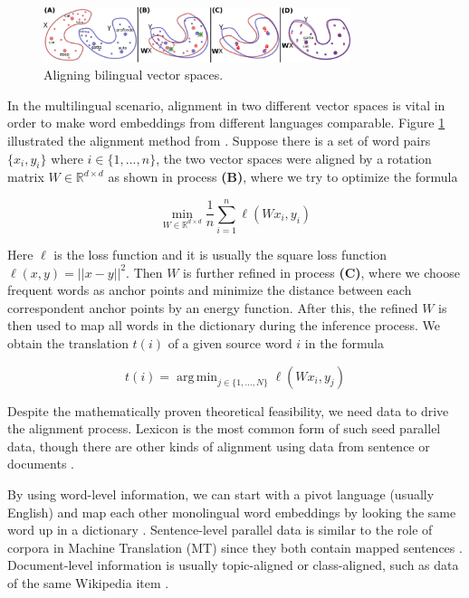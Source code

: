 \documentclass[thesis,fonts=libertine]{cluu}
\DeclareMathOperator*{\argmin}{arg\,min}
\begin{document}
\begin{figure}
  \centering
  \includegraphics[width=0.8\textwidth]{vector_spaces_alignment.png}
  \caption{Aligning bilingual vector spaces. \parencite{Conneau:2017aa}}
  \label{fig:vec_space_align}
\end{figure}

In the multilingual scenario, alignment in two different vector spaces is vital in order to make word embeddings from different languages comparable. Figure \ref{fig:vec_space_align} illustrated the alignment method from \textcite{Conneau:2017aa}. Suppose there is a set of word pairs $\{x_i, y_i\}$ where ${i\in \{1, ..., n\}}$, the two vector spaces were aligned by a rotation matrix $W \in \mathbb{R}^{d \times d}$ as shown in process \textbf{(B)}, where we try to optimize the formula 

\begin{equation*}
  \min_{W \in \mathbb{R}^{d \times d}} \frac{1}{n}\sum_{i=1}^n \ell(Wx_i, y_i)
\end{equation*}

\noindent Here $\ell$ is the loss function and it is usually the square loss function $\ell(x, y)=||x-y||^2$. Then $W$ is further refined in process \textbf{(C)}, where we choose frequent words as anchor points and minimize the distance between each correspondent anchor points by an energy function. After this, the refined $W$ is then used to map all words in the dictionary during the inference process. We obtain the translation $t(i)$ of a given source word $i$ in the formula

\begin{equation*}
  t(i) = \argmin_{j\in \{1, ..., N\}} \ell(Wx_i, y_j)
\end{equation*}

Despite the mathematically proven theoretical feasibility, we need data to drive the alignment process. Lexicon is the most common form of such seed parallel data, though there are other kinds of alignment using data from sentence or documents \parencite{Ruder:2019aa}.

By using word-level information, we can start with a pivot language (usually English) and map each other monolingual word embeddings by looking the same word up in a dictionary \parencite{Mikolov:2013ac}. Sentence-level parallel data is similar to the role of corpora in Machine Translation (MT) since they both contain mapped sentences \parencite{Hermann:2013aa}. Document-level information is usually topic-aligned or class-aligned, such as data of the same Wikipedia item \parencite{vulic-moens-2013-study}.
\end{document}
